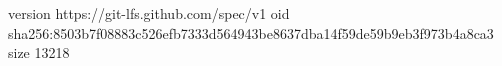 version https://git-lfs.github.com/spec/v1
oid sha256:8503b7f08883c526efb7333d564943be8637dba14f59de59b9eb3f973b4a8ca3
size 13218
